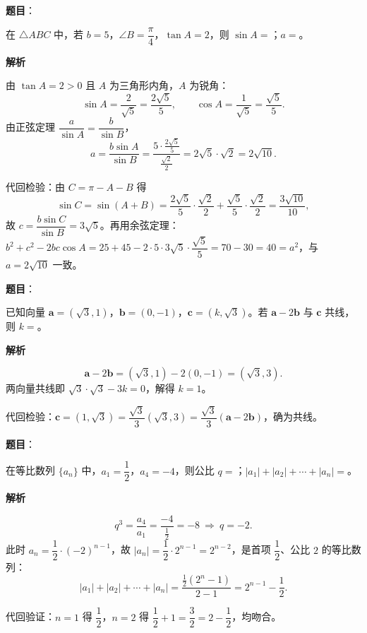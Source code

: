 \begin{answer}

\textbf{题目}：

在 $\triangle ABC$ 中，若 $b=5$，$\angle B=\dfrac{\pi}{4}$，$\tan A=2$，则 $\sin A=$\gkblank{}；$a=$\gkblank{}。

\textbf{解析}

由 $\tan A=2>0$ 且 $A$ 为三角形内角，$A$ 为锐角：
\nopagebreak[4]
\[
\sin A=\frac{2}{\sqrt5}=\frac{2\sqrt5}{5},\qquad \cos A=\frac{1}{\sqrt5}=\frac{\sqrt5}{5}.
\]
由正弦定理 $\dfrac{a}{\sin A}=\dfrac{b}{\sin B}$，
\nopagebreak[4]
\[
a=\frac{b\sin A}{\sin B}
=\frac{5\cdot\frac{2\sqrt5}{5}}{\frac{\sqrt2}{2}}
=2\sqrt5\cdot\sqrt2=2\sqrt{10}.
\]

代回检验：由 $C=\pi-A-B$ 得
\nopagebreak[4]
\[
\sin C=\sin(A+B)=\frac{2\sqrt5}{5}\cdot\frac{\sqrt2}{2}+\frac{\sqrt5}{5}\cdot\frac{\sqrt2}{2}=\frac{3\sqrt{10}}{10},
\]
故 $c=\dfrac{b\sin C}{\sin B}=3\sqrt5$。再用余弦定理：$b^2+c^2-2bc\cos A=25+45-2\cdot5\cdot3\sqrt5\cdot\dfrac{\sqrt5}{5}=70-30=40=a^2$，与 $a=2\sqrt{10}$ 一致。


\end{answer}
\begin{answer}

\textbf{题目}：

已知向量 $\boldsymbol a=(\sqrt3,1)$，$\boldsymbol b=(0,-1)$，$\boldsymbol c=(k,\sqrt3)$。若 $\boldsymbol a-2\boldsymbol b$ 与 $\boldsymbol c$ 共线，则 $k=$\gkblank{}。

\textbf{解析}

\nopagebreak[4]
\[
\boldsymbol a-2\boldsymbol b=(\sqrt3,1)-2(0,-1)=(\sqrt3,3).
\]
两向量共线即 $\sqrt3\cdot\sqrt3-3k=0$，解得 $k=1$。

代回检验：$\boldsymbol c=(1,\sqrt3)=\dfrac{\sqrt3}{3}(\sqrt3,3)=\dfrac{\sqrt3}{3}(\boldsymbol a-2\boldsymbol b)$，确为共线。


\end{answer}
\begin{answer}

\textbf{题目}：

在等比数列 $\{a_n\}$ 中，$a_1=\dfrac12$，$a_4=-4$，则公比 $q=$\gkblank{}；$|a_1|+|a_2|+\cdots+|a_n|=$\gkblank{}。

\textbf{解析}

\nopagebreak[4]
\[
q^3=\frac{a_4}{a_1}=\frac{-4}{\frac12}=-8\ \Longrightarrow\ q=-2.
\]
此时 $a_n=\dfrac12\cdot(-2)^{n-1}$，故 $|a_n|=\dfrac12\cdot2^{n-1}=2^{n-2}$，是首项 $\dfrac12$、公比 $2$ 的等比数列：
\nopagebreak[4]
\[
|a_1|+|a_2|+\cdots+|a_n|=\frac{\frac12\left(2^n-1\right)}{2-1}=2^{n-1}-\frac12.
\]

代回验证：$n=1$ 得 $\dfrac12$，$n=2$ 得 $\dfrac12+1=\dfrac32=2-\dfrac12$，均吻合。


\end{answer}
